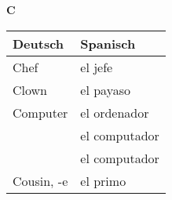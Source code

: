 \begin{flushright}\begin{Huge}\textbf{C}\end{Huge}\end{flushright}

\begin{longtable}{p{} p{}} 
\textbf{Deutsch}     & \textbf{Spanisch}                                       \\ \hline
\hline
\endhead %
Chef & el jefe\\
Clown & el payaso \\
Computer & el ordenador \\
~ & el computador\\
~ & el computador \\
Cousin, -e & el primo \\
\end{longtable}
